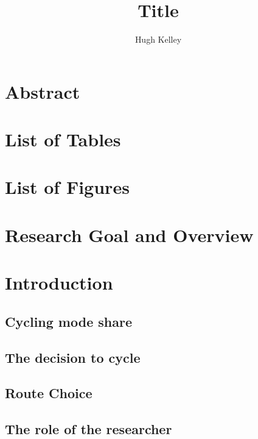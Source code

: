 \documentclass[11pt]{article} %
\title{\vspace{-3.0cm}Title}
\author{Hugh Kelley}
\date{} %
\begin{document}
\maketitle

\section{Abstract}

\section{List of Tables}

\section{List of Figures}


\section{Research Goal and Overview}


\section{Introduction}


\subsection{Cycling mode share}

\subsection{The decision to cycle}

\subsection{Route Choice}

\subsection{The role of the researcher}

\end{document}
